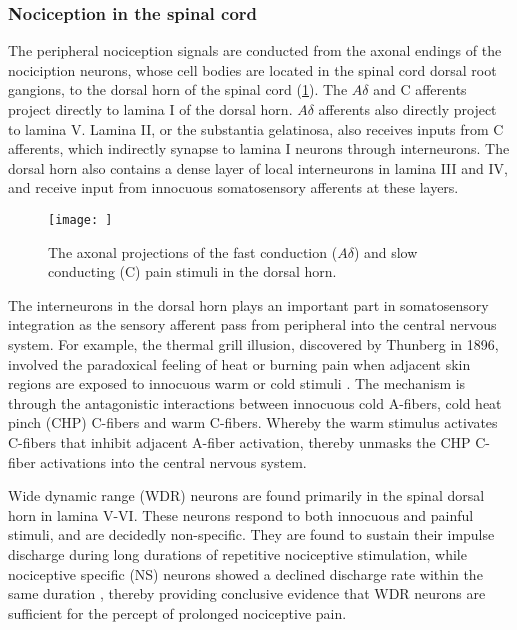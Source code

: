 \subsubsection{Nociception in the spinal cord}

The peripheral nociception signals are conducted from the axonal endings of the nociciption neurons, whose cell bodies are located in the spinal cord dorsal root gangions, to the dorsal horn of the spinal cord (\ref{fig:drg}). The $A\delta$ and C afferents project directly to lamina I of the dorsal horn. $A\delta$ afferents also directly project to lamina V. Lamina II, or the substantia gelatinosa, also receives inputs from C afferents, which indirectly synapse to lamina I neurons through interneurons. The dorsal horn also contains a dense layer of local interneurons in lamina III and IV, and receive input from innocuous somatosensory afferents at these layers. 

\begin{figure}[ht]
\texttt{[image: ]}
\centering
\caption{The axonal projections of the fast conduction ($ A\delta$) and slow conducting (C) pain stimuli in the dorsal horn.}
\label{fig:drg}
\end{figure}
 
The interneurons in the dorsal horn plays an important part in somatosensory integration as the sensory afferent pass from peripheral into the central nervous system. For example, the thermal grill illusion, discovered by Thunberg in 1896, involved the paradoxical feeling of heat or burning pain when adjacent skin regions are exposed to innocuous warm or cold stimuli \cite{Craig1994}. The mechanism is through the antagonistic interactions between innocuous cold A-fibers, cold heat pinch (CHP) C-fibers and warm C-fibers. Whereby the warm stimulus activates C-fibers that inhibit adjacent A-fiber activation, thereby unmasks the CHP C-fiber activations into the central nervous system.

Wide dynamic range (WDR) neurons are found primarily in the spinal dorsal horn in lamina V-VI. These neurons respond to both innocuous and painful stimuli, and are decidedly non-specific. They are found to sustain their impulse discharge during long durations of repetitive nociceptive stimulation, while nociceptive specific (NS) neurons showed a declined discharge rate within the same duration \cite{Coghill1993,Maixner1986}, thereby providing conclusive evidence that WDR neurons are sufficient for the percept of prolonged nociceptive pain. 

